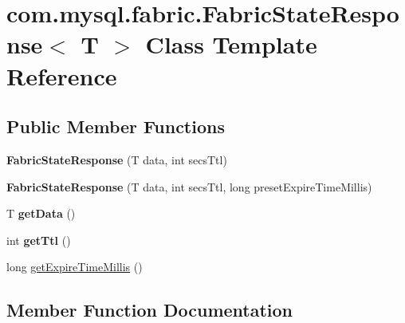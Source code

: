 \hypertarget{classcom_1_1mysql_1_1fabric_1_1_fabric_state_response}{}\section{com.\+mysql.\+fabric.\+Fabric\+State\+Response$<$ T $>$ Class Template Reference}
\label{classcom_1_1mysql_1_1fabric_1_1_fabric_state_response}
\subsection*{Public Member Functions}
\begin{DoxyCompactItemize}
\item 
\mbox{\label{classcom_1_1mysql_1_1fabric_1_1_fabric_state_response_a09b9544434cf3c9487efa887aa936757}} 
{\bfseries Fabric\+State\+Response} (T data, int secs\+Ttl)
\item 
\mbox{\label{classcom_1_1mysql_1_1fabric_1_1_fabric_state_response_ac4ea31ee8f5a98957eef2104300e4c7b}} 
{\bfseries Fabric\+State\+Response} (T data, int secs\+Ttl, long preset\+Expire\+Time\+Millis)
\item 
\mbox{\label{classcom_1_1mysql_1_1fabric_1_1_fabric_state_response_a3d62d4e8b77b81c9f49daea9fe1ad812}} 
T {\bfseries get\+Data} ()
\item 
\mbox{\label{classcom_1_1mysql_1_1fabric_1_1_fabric_state_response_a9f0bd6bd996b1b52487f64fa0ab892e2}} 
int {\bfseries get\+Ttl} ()
\item 
long \mbox{\hyperlink{classcom_1_1mysql_1_1fabric_1_1_fabric_state_response_addba05821ef4572c9270bfea44f36826}{get\+Expire\+Time\+Millis}} ()
\end{DoxyCompactItemize}


\subsection{Member Function Documentation}
\mbox{\label{classcom_1_1mysql_1_1fabric_1_1_fabric_state_response_addba05821ef4572c9270bfea44f36826}} 
